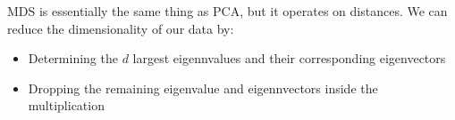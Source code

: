 MDS is essentially the same thing as PCA, but it operates on distances. We can reduce the dimensionality of our data by:
\begin{itemize}
    \item
        Determining the \(d\) largest eigennvalues and their corresponding eigenvectors
    \item
        Dropping the remaining eigenvalue and eigennvectors inside the multiplication
\end{itemize}

